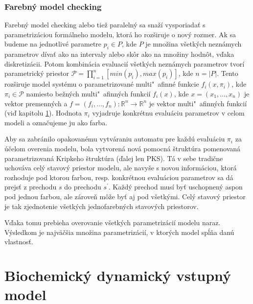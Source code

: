 \documentclass[11pt,final,oneside]{fithesis}
\begin{document}
\subsection{Farebn\' y model checking}
Farebn\'y model checking alebo tie\v z paraleln\'y sa sna\v z\'i vysporiada\v t s parametriz\'aciou form\'alneho modelu, ktor\'a ho roz\v siruje o nov\'y
rozmer. Ak sa budeme na jednotliv\'e parametre $p_i \in P$, kde $P$ je mno\v zina v\v setk\'ych nezn\'amych parametrov d\'iva\v t ako na intervaly alebo 
sk\^ or ako na mno\v ziny hodn\^ ot, v\v daka diskretiz\'acii. Potom kombin\'acia evaluaci\'i v\v setk\'ych nezn\'amych parametrov tvor\'i parametrick\'y
priestor $\mathcal{P} = \prod_{i = 1}^n [min(p_i),max(p_i)]$, kde $n = |P|$. Tento roz\v siruje model syst\'emu o parametrizovan\'e multi"~afinn\'e funkcie 
$f_i(x,\pi_i)$, kde $\pi_i \in \mathcal{P}$ namiesto be\v zn\'ych multi"~afinn\'ych funkci\'i $f_i(x)$, kde $x = (x_1,\dots{},x_n)$ je vektor premenn\'ych
a $f = (f_i,\dots{},f_n) : \mathbb{R}^n \rightarrow \mathbb{R}^n$ je vektor multi"~afinn\'ych funkci\'i (vi\v d kapitolu \ref{sec:model}). Hodnota $\pi_i$
vyjadruje konkr\'etnu evalu\'aciu parametrov v celom modeli a ozna\v cujeme ju ako farba.

Aby sa zabr\'anilo opakovan\'emu vytv\'araniu automatu pre ka\v zd\'u evalu\'aciu $\pi_i$ za \'u\v celom overenia modelu, bola vytvoren\'a nov\'a pomocn\'a
\v strukt\'ura pomenovan\'a parametrizovan\'a Kripkeho \v strukt\'ura (\v dalej len PKS). T\'a v sebe tradi\v cne uchov\'ava cel\'y stavov\'y priestor modelu,
ale navy\v se s novou inform\'aciou, ktor\'a rozhoduje pod ktorou farbou, resp. konkr\'etnou evalu\'aciou parametrov sa d\'a prejs\v t z prechodu $s$ 
do prechodu $s^{'}$. Ka\v zd\'y prechod mus\'i by\v t uschopnen\'y aspon pod jednou farbou, ale z\'arove\v n m\^ o\v ze by\v t aj pod v\v setk\'ymi. Cel\'y
stavov\'y priestor je tak zjednotenie v\v setk\'ych jednofarebn\'ych stavov\'ych priestorov.

V\v daka tomu prebieha overovanie v\v setk\'ych parametriz\'aci\'i modelu naraz. V\'ysledkom je najv\"a\v c\v sia mno\v zina parametriz\'aci\'i, v ktor\'ych
model sp\'l\v na dan\'u vlastnos\v t. \cite{TCBB-2010}

\chapter{Biochemick\'y dynamick\'y vstupn\'y model}
\label{sec:model}
\end{document}
